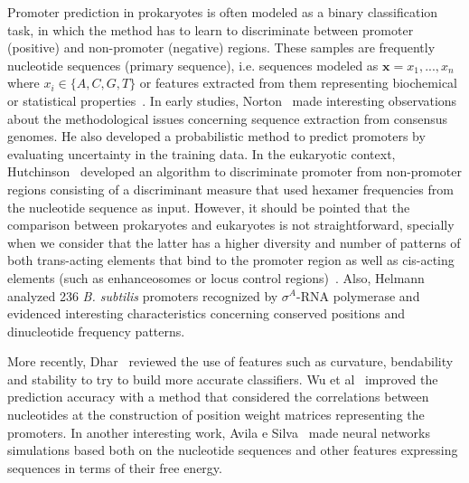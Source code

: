 \documentclass[conference]{IEEEtran}
\begin{document}
Promoter prediction in prokaryotes is often modeled as a binary classification task, in which the method has to learn to discriminate between promoter (positive) and non-promoter (negative) regions. These samples are frequently nucleotide sequences (primary sequence), i.e. sequences modeled as $ \bm{x} = x_1, ..., x_n $ where $ x_i \in \{A,C,G,T\} $ or features extracted from them representing biochemical or statistical properties~\cite{avila2011}. In early studies, Norton~\cite{norton1994} made interesting observations about the methodological issues concerning sequence extraction from consensus genomes. He also developed a probabilistic method to predict promoters by evaluating uncertainty in the training data. In the eukaryotic context, Hutchinson~\cite{hutchinson1996} developed an algorithm to discriminate promoter from non-promoter regions consisting of a discriminant measure that used hexamer frequencies from the nucleotide sequence as input. However, it should be pointed that the comparison between prokaryotes and eukaryotes is not straightforward, specially when we consider that the latter has a higher diversity and number of patterns of both trans-acting elements that bind to the promoter region as well as cis-acting elements (such as enhanceosomes or locus control regions)~\cite{pedersen1999,maston2006}. Also, Helmann~\cite{helmann1995} analyzed 236 {\it B. subtilis} promoters recognized by ${\sigma }^{{A}}$-RNA polymerase and evidenced interesting characteristics concerning conserved positions and dinucleotide frequency patterns.

More recently, Dhar~\cite{dhar2010} reviewed the use of features such as curvature, bendability and stability to try to build more accurate classifiers. Wu et al~\cite{wu2011} improved the prediction accuracy with a method that considered the correlations between nucleotides at the construction of position weight matrices representing the promoters. In another interesting work, Avila e Silva~\cite{avila2011} made neural networks simulations based both on the nucleotide sequences and other features expressing sequences in terms of their free energy.
\end{document}
